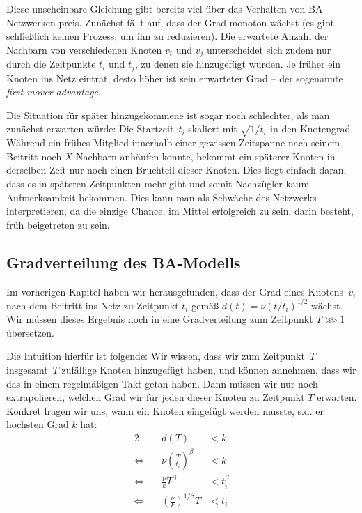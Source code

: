 Diese unscheinbare Gleichung gibt bereits viel über das Verhalten von BA-Netzwerken preis.
Zunächst fällt auf, dass der Grad monoton wächst (es gibt schließlich keinen Prozess, um ihn zu reduzieren).
Die erwartete Anzahl der Nachbarn von verschiedenen Knoten $v_i$ und $v_j$ unterscheidet sich zudem nur durch die Zeitpunkte $t_i$ und $t_j$, zu denen sie hinzugefügt wurden.
Je früher ein Knoten ins Netz eintrat, desto höher ist sein erwarteter Grad -- der sogenannte  \emph{first-mover advantage}.

Die Situation für später hinzugekommene ist sogar noch schlechter, als man zunächst erwarten würde:
Die Startzeit~$t_i$ skaliert mit $\sqrt{1 / t_i}$ in den Knotengrad.
Während ein frühes Mitglied innerhalb einer gewissen Zeitspanne nach seinem Beitritt noch $X$ Nachbarn anhäufen konnte, bekommt ein späterer Knoten in derselben Zeit nur noch einen Bruchteil dieser Knoten.
Dies liegt einfach daran, dass es in späteren Zeitpunkten mehr  gibt und somit Nachzügler kaum Aufmerksamkeit bekommen.
Dies kann man als Schwäche des Netzwerks interpretieren, da die einzige Chance, im Mittel erfolgreich zu sein, darin besteht, früh beigetreten zu sein.

\subsection{Gradverteilung des BA-Modells}
Im vorherigen Kapitel haben wir herausgefunden, dass der Grad eines Knotens~$v_i$ nach dem Beitritt ins Netz zu Zeitpunkt $t_i$ gemäß $d(t) = \nu (t  / t_i)^{1/2}$ wächst.
Wir müssen dieses Ergebnis noch in eine Gradverteilung zum Zeitpunkt $T \ggg 1$ übersetzen.

Die Intuition hierfür ist folgende:
Wir wissen, dass wir zum Zeitpunkt~$T$ insgesamt~$T$ zufällige Knoten hinzugefügt haben, und können annehmen, dass wir das in einem regelmäßigen Takt getan haben.
Dann müssen wir nur noch extrapolieren, welchen Grad wir für jeden dieser Knoten zu Zeitpunkt $T$ erwarten.
Konkret fragen wir uns, wann ein Knoten eingefügt werden musste, s.d. er höchsten Grad $k$ hat:
\begin{alignat}{2}
                     &  & d(T)                                   & < k         \\
    \Leftrightarrow~ &  & \nu \left(\frac{T}{t_i}\right)^\beta   & < k         \\
    \Leftrightarrow~ &  & \frac{\nu}{k} T^\beta                  & < t_i^\beta \\
    \Leftrightarrow~ &  & \left(\frac{\nu}{k}\right)^{1/\beta} T & < t_i
\end{alignat}

